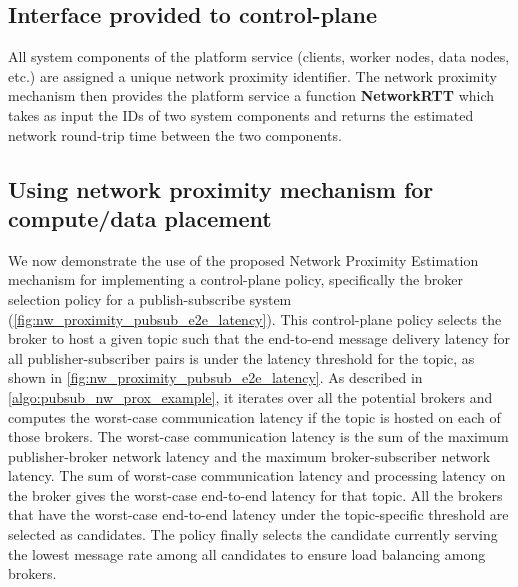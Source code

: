\subsection{Interface provided to control-plane}
All system components of the platform service (clients, worker nodes, data nodes, etc.) are assigned a unique network proximity identifier. The network proximity mechanism then provides the platform service a function \textbf{NetworkRTT} which takes as input the IDs of two system components and returns the estimated network round-trip time between the two components. 

\subsection{Using network proximity mechanism for compute/data placement}
\label{sec:policy_using_nw_prox}

We now demonstrate the use of the proposed Network Proximity Estimation mechanism for implementing a control-plane policy, specifically the broker selection policy for a publish-subscribe system (\cref{fig:nw_proximity_pubsub_e2e_latency}). This control-plane policy selects the broker to host a given topic such that the end-to-end message delivery latency for all publisher-subscriber pairs is under the latency threshold for the topic, as shown in \cref{fig:nw_proximity_pubsub_e2e_latency}. As described in \cref{algo:pubsub_nw_prox_example}, it iterates over all the potential brokers and computes the worst-case communication latency if the topic is hosted on each of those brokers. The worst-case communication latency is the sum of the maximum publisher-broker network latency and the maximum broker-subscriber network latency. The sum of worst-case communication latency and processing latency on the broker gives the worst-case end-to-end latency for that topic. All the brokers that have the worst-case end-to-end latency under the topic-specific threshold are selected as candidates. The policy finally selects the candidate currently serving the lowest message rate among all candidates to ensure load balancing among brokers.

